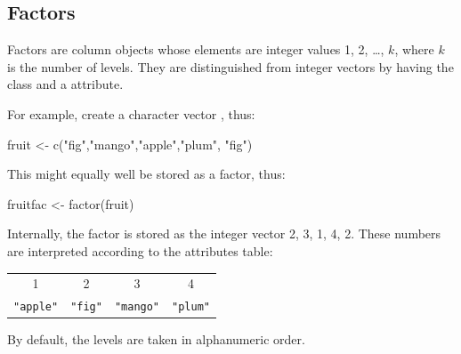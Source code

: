 \subsection{Factors}\label{ss:factors}

Factors are column objects whose elements are integer values 1, 2,
\ldots, $k$, where $k$ is the number of levels.  They are
distinguished from integer vectors by having the class 
and a  attribute.

For example, create a character vector , thus:
\begin{Schunk}
\begin{Sinput}
fruit <- c("fig","mango","apple","plum", "fig")
\end{Sinput}
\end{Schunk}
This might equally well be stored as a factor, thus:
\begin{Schunk}
\begin{Sinput}
fruitfac <- factor(fruit)
\end{Sinput}
\end{Schunk}

Internally, the factor is stored
as the integer vector 2, 3, 1, 4, 2. These numbers are
interpreted according to the attributes table:\\[2mm]
\begin{tabular}{|cccc|}
\hline
1 & 2 & 3 & 4\\
\verb!"apple"! & \verb!"fig"! & \verb!"mango"! & \verb!"plum"!\\
\hline
\end{tabular}
\vspace*{8pt}

\noindent
By default, the levels are taken in alphanumeric order.

